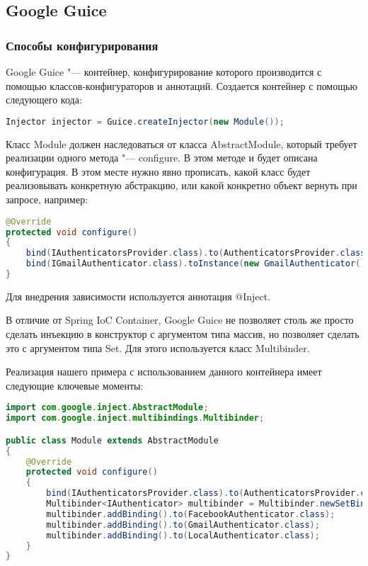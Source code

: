 \subsection{Google Guice}

\subsubsection{Способы конфигурирования}

Google Guice "--- контейнер, конфигурирование которого производится с помощью классов-конфигураторов и аннотаций. Создается контейнер с помощью следующего кода:

\begin{lstlisting}[language=Java,caption={Создание контейнера}]
Injector injector = Guice.createInjector(new Module());
\end{lstlisting}

Класс Module должен наследоваться от класса AbstractModule, который требует реализации одного метода "--- configure. В этом методе и будет описана конфигурация.
В этом месте нужно явно прописать, какой класс будет реализовывать конкретную абстракцию, или какой конкретно объект вернуть при запросе, например:

\begin{lstlisting}[language=Java,caption={Примеры конфигурирования в наследнике AbstractModule}]
@Override
protected void configure()
{
	bind(IAuthenticatorsProvider.class).to(AuthenticatorsProvider.class);
	bind(IGmailAuthenticator.class).toInstance(new GmailAuthenticator());
}
\end{lstlisting}

Для внедрения зависимости используется аннотация @Inject.

В отличие от Spring IoC Container, Google Guice не позволяет столь же просто сделать инъекцию в конструктор с аргументом типа массив, но позволяет сделать это с аргументом типа Set.
Для этого используется класс Multibinder.

Реализация нашего примера с использованием данного контейнера имеет следующие ключевые моменты:

\begin{lstlisting}[language=Java,caption={Конфигурирование}]
import com.google.inject.AbstractModule;
import com.google.inject.multibindings.Multibinder;

public class Module extends AbstractModule
{
    @Override
    protected void configure()
    {
        bind(IAuthenticatorsProvider.class).to(AuthenticatorsProvider.class);
        Multibinder<IAuthenticator> multibinder = Multibinder.newSetBinder(binder(), IAuthenticator.class);
        multibinder.addBinding().to(FacebookAuthenticator.class);
        multibinder.addBinding().to(GmailAuthenticator.class);
        multibinder.addBinding().to(LocalAuthenticator.class);
    }
}
\end{lstlisting}

